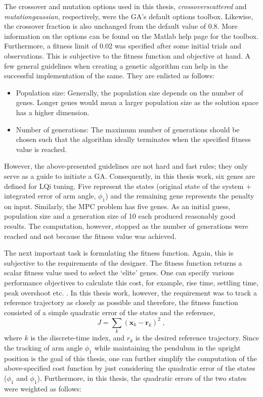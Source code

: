 The crossover and mutation options used in this thesis, \textit{crossoverscattered} and \textit{mutationgaussian}, respectively, were the GA's default options toolbox. Likewise, the crossover fraction is also unchanged from the default value of 0.8. More information on the options can be found on the Matlab help page for the toolbox. Furthermore, a fitness limit of 0.02 was specified after some initial trials and observations. This is subjective to the fitness function and objective at hand. A few general guidelines when creating a genetic algorithm can help in the successful implementation of the same. They are enlisted as follows:
\begin{itemize}
    \item Population size: Generally, the population size depends on the number of genes. Longer genes would mean a larger population size as the solution space has a higher dimension. 
    \item Number of generations: The maximum number of generations should be chosen such that the algorithm ideally terminates when the specified fitness value is reached.
\end{itemize}
However, the above-presented guidelines are not hard and fast rules; they only serve as a guide to initiate a GA. Consequently, in this thesis work, six genes are defined for LQi tuning. Five represent the states (original state of the system + integrated error of arm angle, $\phi_1$) and the remaining gene represents the penalty on input. Similarly, the MPC problem has five genes. As an initial guess, population size and a generation size of 10 each produced reasonably good results. The computation, however, stopped as the number of generations were reached and not because the fitness value was achieved.\par
The next important task is formulating the fitness function. Again, this is subjective to the requirements of the designer. The fitness function returns a scalar fitness value used to select the `elite' genes. One can specify various performance objectives to calculate this cost, for example, rise time, settling time, peak overshoot etc. . In this thesis work, however, the requirement was to track a reference trajectory as closely as possible and therefore, the fitness function consisted of a simple quadratic error of the states and the reference, 
\begin{equation}
    J = \sum_k (\mathbf{x}_k - \mathbf{r}_k)^2 \;,
\end{equation}
where $k$ is the discrete-time index, and $r_k$ is the desired reference trajectory. Since the tracking of arm angle $\phi_1$ while maintaining the pendulum in the upright position is the goal of this thesis, one can further simplify the computation of the above-specified cost function by just considering the quadratic error of the states ($\phi_1$ and $\Dot{\phi_1}$). Furthermore, in this thesis, the quadratic errors of the two states were weighted as follows:
